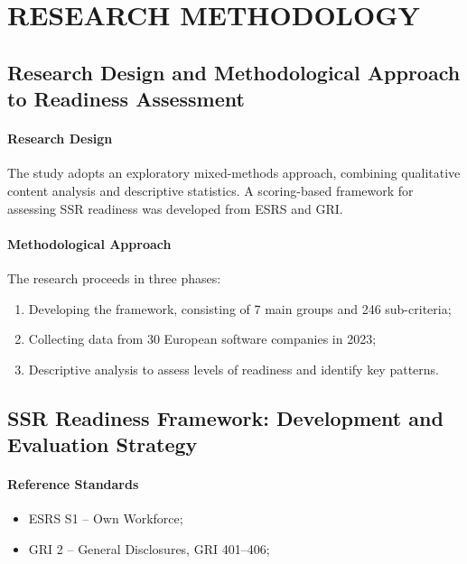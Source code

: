 \chapter{RESEARCH METHODOLOGY}

\section{Research Design and Methodological Approach to Readiness Assessment}

\subsubsection{Research Design}
The study adopts an exploratory mixed-methods approach, combining qualitative content analysis 
and descriptive statistics. 
A scoring-based framework for assessing SSR readiness was developed from ESRS and GRI.

\subsubsection{Methodological Approach}
The research proceeds in three phases:
\begin{enumerate}
    \item Developing the framework, consisting of 7 main groups and 246 sub-criteria;
    \item Collecting data from 30 European software companies in 2023;
    \item Descriptive analysis to assess levels of readiness and identify key patterns.
\end{enumerate}

\section{SSR Readiness Framework: Development and Evaluation Strategy}
\subsubsection{Reference Standards}
\begin{itemize}
    \item ESRS S1 -- Own Workforce;
    \item GRI 2 -- General Disclosures, GRI 401--406;
\end{itemize}

